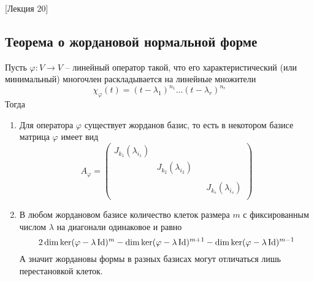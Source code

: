 [Лекция 20]


\subsection{Теорема о жордановой нормальной форме}

\begin{claim}
\label{claim::JNF}
Пусть $\varphi\colon V\to V$ -- линейный оператор такой, что его характеристический (или минимальный) многочлен раскладывается на линейные множители
\[
\chi_\varphi(t) = (t - \lambda_1)^{n_1} \ldots (t - \lambda_r)^{n_r}
\]
Тогда
\begin{enumerate}
\item Для оператора $\varphi$ существует жорданов базис, то есть в некотором базисе матрица $\varphi$ имеет вид
\[
A_\varphi = 
\begin{pmatrix}
{J_{k_1}(\lambda_{i_1})}&{}&{}&{}\\
{}&{J_{k_2}(\lambda_{i_2})}&{}&{}\\
{}&{}&{}&{}\\
{}&{}&{}&{J_{k_s}(\lambda_{i_s})}\\
\end{pmatrix}
\]

\item В любом жордановом базисе количество клеток размера $m$ с фиксированным числом $\lambda$ на диагонали одинаковое и равно
\[
2\dim \ker (\varphi - \lambda\operatorname{Id})^m - \dim \ker (\varphi - \lambda\operatorname{Id})^{m+1} - \dim \ker (\varphi - \lambda\operatorname{Id})^{m-1}
\]
А значит жордановы формы в разных базисах могут отличаться лишь перестановкой клеток.
\end{enumerate}
\end{claim}
